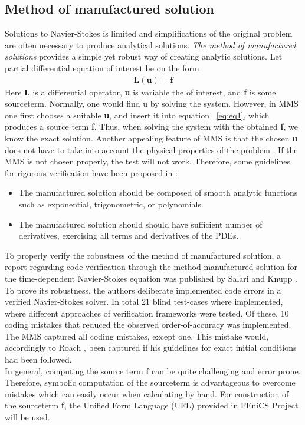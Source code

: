 \subsection{Method of manufactured solution}
Solutions to Navier-Stokes is limited and simplifications of the original problem are often necessary to produce analytical solutions. \textit{The method of manufactured solutions} provides a simple yet robust way of creating analytic solutions. Let partial differential equation of interest be on the form
\begin{align*}
\textbf{L}(\textbf{u}) = \textbf{f}
\label{eq:eq1}
\end{align*}
Here \textbf{L} is a differential operator, \textbf{u} is variable the of interest, and \textbf{f} is some sourceterm. Normally, one would find u by solving the system. However, in MMS one first chooses a suitable \textbf{u}, and insert it into equation ~\ref{eq:eq1}, which produces a source term \textbf{f}. Thus, when solving the system with the obtained \textbf{f}, we know the exact solution. Another appealing feature of MMS is that the chosen \textbf{u} does not have to take into account the physical properties of the problem \cite{Roache2002}. 
\newpage
If the MMS is not chosen properly, the test will not work. Therefore, some guidelines for rigorous verification have been proposed in \cite{Etienne2006, Biggs, Roache2002}:
\begin{itemize}
\item The manufactured solution should be composed of smooth analytic functions such as exponential, trigonometric, or polynomials.
\item The manufactured solution should should have sufficient number of derivatives, exercising all terms and derivatives of the PDEs. 
\end{itemize}
To properly verify the robustness of the method of manufactured solution, a report regarding code verification through the method manufactured solution for the time-dependent Navier-Stokes equation was published by Salari and Knupp \cite{Biggs}.  To prove its robustness, the authors deliberate implemented  code errors in a verified Navier-Stokes solver. In total 21 blind test-cases where implemented, where different approaches of verification frameworks were tested.  Of these, 10 coding mistakes that reduced the observed order-of-accuracy was implemented. The MMS captured all coding mistakes, except one. This mistake would, accordingly to Roach \cite{Biggs}, been captured if his guidelines for exact initial conditions had been followed. \\
In general, computing the source term $\mathbf{f}$ can be quite challenging and error prone.  Therefore, symbolic computation of the sourceterm is advantageous to overcome mistakes which can easily occur when calculating by hand. For construction of the sourceterm \textbf{f}, the Unified Form Language (UFL) provided in FEniCS Project will be used. 
